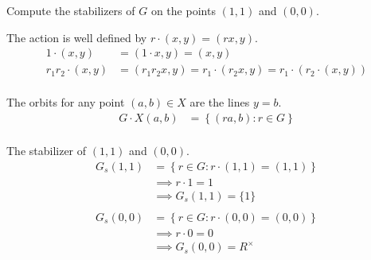 \begin{problem}
\begin{enumalph}
    Compute the stabilizers of $G$ on the points $(1,1)$ and $(0,0)$.
    \begin{Answer}
      \begin{enumroman}
        \item The action is well defined by $r \cdot (x,y) = (rx,y)$.
          \begin{align*}
            1 \cdot (x,y) &= (1 \cdot x, y) = (x,y) \\
            r_1r_2 \cdot (x,y) &= (r_1r_2x, y) = r_1 \cdot (r_2x, y) = r_1 \cdot (r_2 \cdot (x, y)) \\
          \end{align*}
        \item The orbits for any point $(a, b) \in X$ are the lines $y = b$.
          \begin{align*}
            G \cdot X (a, b)&= \left\{(ra,b) : r \in G \right\} \\
          \end{align*}
        \item The stabilizer of $(1,1)$ and $(0,0)$.
          \begin{align*}
            G_s(1, 1) &= \left\{r \in G : r \cdot (1,1) = (1,1)\right\} \\
                      &\implies r \cdot 1 = 1 \\
                      &\implies G_s(1, 1) = \{ 1 \} \\
            \\
            G_s(0, 0) &= \left\{r \in G : r \cdot (0,0) = (0,0)\right\} \\
                      &\implies r \cdot 0 = 0 \\
                      &\implies G_s(0,0) = R^\times \\
          \end{align*}
      \end{enumroman}
    \end{Answer}
  \end{enumalph}
\end{problem}

